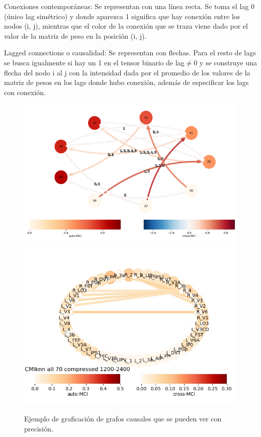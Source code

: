 \documentclass[a4paper,10pt,twocolumn]{article}
\begin{document}
\begin{description}


\item	Conexiones contemporáneas: Se representan con una línea recta. Se toma el lag 0
(único lag simétrico) y donde aparezca 1 significa que hay conexión entre los nodos (i, j),
mientras que el color de la conexión que se traza viene dado por el valor de la matriz de peso
en la posición (i, j).\\

\item	Lagged connections o causalidad: Se representan con flechas. Para el resto de lags se
busca igualmente si hay un 1 en el tensor binario de 
lag$\neq $0 y se construye una flecha del nodo i al j con la intensidad dada por el promedio
de los valores de la matriz de pesos en los lags donde hubo conexión, además de especificar
los lags con conexión.\\

\end{description}

\begin{figure}[h!]%
\center
\includegraphics[scale=0.95]{example1.png}
\includegraphics[scale=0.45]{example.png}
\caption{Ejemplo de graficación de grafos causales que se pueden ver con precisión.}
\end{figure}
\end{document}
